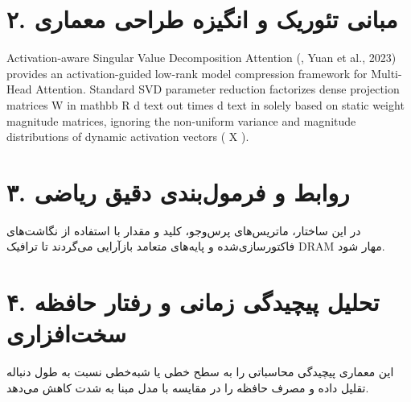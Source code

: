 \documentclass[12pt,a4paper]{article}
\begin{document}
\section*{۲. مبانی تئوریک و انگیزه طراحی معماری}
Activation-aware Singular Value Decomposition Attention (, Yuan et al., 2023) provides an activation-guided low-rank model compression framework for Multi-Head Attention. Standard SVD parameter reduction factorizes dense projection matrices W in mathbb R d text out times d text in solely based on static weight magnitude matrices, ignoring the non-uniform variance and magnitude distributions of dynamic activation vectors ( X ).

\section*{۳. روابط و فرمول‌بندی دقیق ریاضی}
در این ساختار، ماتریس‌های پرس‌وجو، کلید و مقدار با استفاده از نگاشت‌های فاکتورسازی‌شده و پایه‌های متعامد بازآرایی می‌گردند تا ترافیک DRAM مهار شود.

\section*{۴. تحلیل پیچیدگی زمانی و رفتار حافظه سخت‌افزاری}
این معماری پیچیدگی محاسباتی را به سطح خطی یا شبه‌خطی نسبت به طول دنباله تقلیل داده و مصرف حافظه را در مقایسه با مدل مبنا به شدت کاهش می‌دهد.
\end{document}
